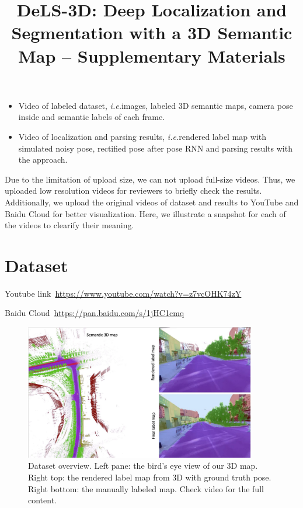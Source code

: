 \documentclass[10pt,twocolumn,letterpaper]{article}
\def\ie{\emph{i.e.}}
\begin{document}
\onecolumn
\title{DeLS-3D: Deep Localization and Segmentation with a 3D Semantic Map -- Supplementary Materials}

\maketitle


\begin{itemize}
\vspace{-0.5\baselineskip}
    \setlength{\itemsep}{-2pt}
    \item Video of labeled dataset, \ie images, labeled 3D semantic maps, camera pose inside and semantic labels of each frame.
    \item Video of localization and parsing results, \ie rendered label map with simulated noisy pose, rectified pose after pose RNN and parsing results with the approach.
\vspace{-0.4\baselineskip}
\end{itemize}

Due to the limitation of upload size, we can not upload full-size videos. Thus, we uploaded low resolution videos for reviewers to briefly check the results. 
Additionally, we upload the original videos of dataset and results to YouTube and Baidu Cloud for better visualization. Here, we illustrate a snapshot for each of the videos to clearify their meaning.

\section{Dataset} 
Youtube link~\url{https://www.youtube.com/watch?v=z7vcOHK74zY}

Baidu Cloud~\url{https://pan.baidu.com/s/1jHC1cmq}

\begin{figure}[!hbpt]
\center
\includegraphics[width=0.9\textwidth]{fig/dataset_video.pdf}
\caption{Dataset overview. Left pane: the bird's eye view of our 3D map. Right top: the rendered label map from 3D with ground truth pose. Right bottom: the manually labeled map. Check video for the full content.}
\label{fig:framework}
\end{figure}
\end{document}
